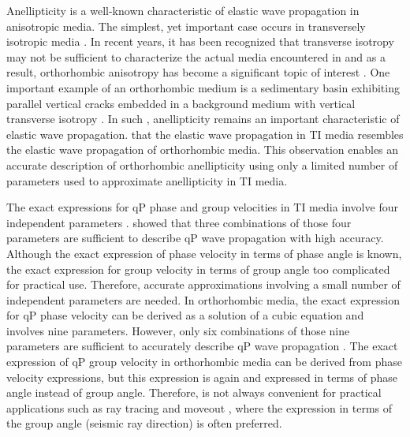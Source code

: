 Anellipticity is a well-known characteristic of elastic wave propagation in anisotropic media. 
The simplest, yet  important case  occurs in transversely isotropic media  \cite[]{grechkabook,tsvankinbook,thomsenbook}.
In recent years, it has been recognized that transverse isotropy may not be sufficient to characterize the actual media encountered in   and as a result, orthorhombic anisotropy has become a significant topic of interest \cite[e.g.][]{tsvankinortho,tsvankinbook,bakulin2,xu,vascon,grechkabook,fowlerortho,thomsenbook}. 
One important example of an orthorhombic medium is a sedimentary basin exhibiting parallel vertical cracks embedded in a background medium 
with vertical transverse isotropy \cite[]{helbig,tsvankinortho,tsvankinbook,grechkabook}. 
In such  ,  anellipticity remains an important characteristic of elastic wave propagation.\cite{tsvankinortho,tsvankinbook}  that the elastic wave propagation in TI media resembles the elastic wave propagation  of orthorhombic media. This observation enables an accurate description of orthorhombic anellipticity using only a limited number of parameters  used to approximate anellipticity in TI media.

The exact expressions for qP phase and group velocities in TI media involve four independent parameters \cite[]{gass,berryman}. 
\cite{alkatsvankin}  showed that three combinations of those four parameters are sufficient to describe qP wave propagation with high accuracy. Although the exact expression of phase velocity in terms of phase angle is known, the exact expression for group velocity 
in terms of group angle  too complicated for practical use. Therefore, accurate approximations involving a small number of independent parameters are needed. In orthorhombic media, the exact expression for qP phase velocity can be derived as a solution of a cubic equation and involves nine parameters. However, only six combinations of those nine parameters are sufficient to accurately describe qP wave propagation \cite[]{tsvankinortho,tsvankinbook}. The exact expression of qP group velocity in orthorhombic media can be derived from phase velocity expressions, but this expression is again  and  expressed in terms of  phase angle instead of group angle. 
Therefore,  is not always convenient for practical applications such as ray tracing and moveout  , where the expression in terms of the group angle (seismic ray direction) is often preferred. 


